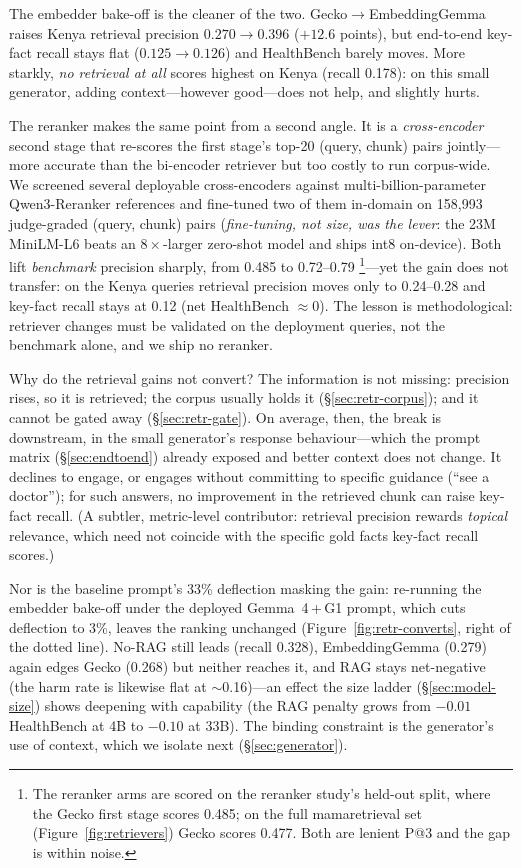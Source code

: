 The embedder bake-off is the cleaner of the two. Gecko$\to$EmbeddingGemma
raises Kenya retrieval precision $0.270\to0.396$ ($+12.6$ points), but
end-to-end key-fact recall stays flat ($0.125\to0.126$) and HealthBench barely
moves. More starkly, \emph{no retrieval at all} scores highest on Kenya
(recall 0.178): on this small generator, adding context---however good---does
not help, and slightly hurts.

The reranker makes the same point from a second angle. It is a
\emph{cross-encoder} second stage that re-scores the first stage's top-20
(query, chunk) pairs jointly---more accurate than the bi-encoder retriever but
too costly to run corpus-wide. We screened several deployable cross-encoders
against multi-billion-parameter Qwen3-Reranker references and fine-tuned two
of them in-domain on 158{,}993 judge-graded (query, chunk) pairs
(\emph{fine-tuning, not size, was the lever}: the 23M MiniLM-L6 beats an
$8\times$-larger zero-shot model and ships int8 on-device). Both lift
\emph{benchmark} precision sharply, from 0.485 to 0.72--0.79%
\footnote{The reranker arms are scored on the reranker study's held-out split,
where the Gecko first stage scores 0.485; on the full mamaretrieval set
(Figure~\ref{fig:retrievers}) Gecko scores 0.477. Both are lenient P@3 and the
gap is within noise.}---yet the gain does not transfer: on the Kenya queries retrieval precision moves only to
0.24--0.28 and key-fact recall stays at 0.12 (net HealthBench $\approx0$). The lesson is methodological: retriever
changes must be validated on the deployment queries, not the benchmark alone,
and we ship no reranker.

Why do the retrieval gains not convert? The information is not missing:
precision rises, so it is retrieved; the corpus usually holds it
(\S\ref{sec:retr-corpus}); and it cannot be gated away
(\S\ref{sec:retr-gate}). On average, then, the break is downstream, in the
small generator's response behaviour---which the prompt matrix
(\S\ref{sec:endtoend}) already exposed and better context does not change. It declines to engage, or engages
without committing to specific guidance (``see a doctor''); for such answers,
no improvement in the retrieved chunk can raise key-fact recall. (A subtler,
metric-level contributor: retrieval precision rewards \emph{topical}
relevance, which need not coincide with the specific gold facts key-fact
recall scores.)

Nor is the baseline prompt's 33\% deflection masking the gain: re-running the
embedder bake-off under the deployed Gemma~4\,+\,G1 prompt, which cuts
deflection to 3\%, leaves the ranking unchanged (Figure~\ref{fig:retr-converts},
right of the dotted line). No-RAG still leads (recall 0.328), EmbeddingGemma
(0.279) again edges Gecko (0.268) but neither reaches it, and RAG stays
net-negative (the harm rate is likewise flat at $\sim$0.16)---an effect the
size ladder (\S\ref{sec:model-size}) shows deepening with capability (the RAG
penalty grows from $-0.01$ HealthBench at 4B to $-0.10$ at 33B). The binding
constraint is the generator's use of context, which we isolate next
(\S\ref{sec:generator}).

